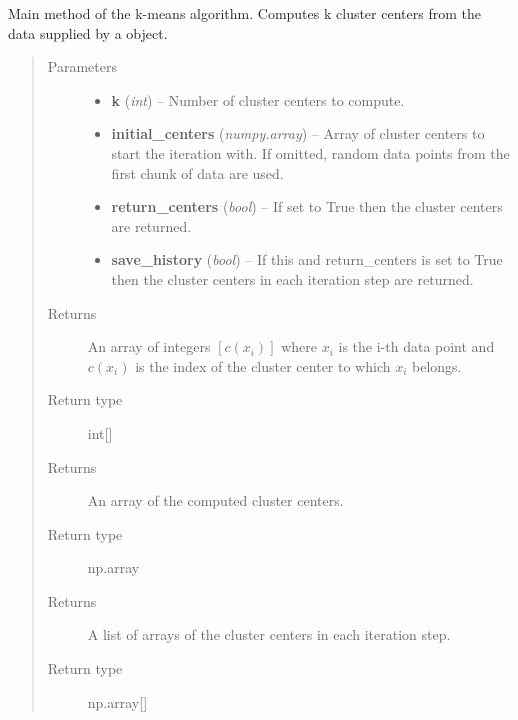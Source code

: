 \documentclass[letterpaper,10pt,english]{sphinxmanual}
\begin{document}
\begin{fulllineitems}
\begin{fulllineitems}
\label{kmeans:kmeans.DefaultKmeans.calculate_centers}
Main method of the k-means algorithm. Computes k cluster centers from the data supplied by a
{\hyperref[common:common_data_importer.CommonDataImporter]{}} object.
\begin{quote}\begin{description}
\item[{Parameters}] \leavevmode\begin{itemize}
\item {} 
\textbf{k} (\emph{int}) -- Number of cluster centers to compute.

\item {} 
\textbf{initial\_centers} (\emph{numpy.array}) -- Array of cluster centers to start the iteration with. If omitted, random data points
from the first chunk of data are used.

\item {} 
\textbf{return\_centers} (\emph{bool}) -- If set to True then the cluster centers are returned.

\item {} 
\textbf{save\_history} (\emph{bool}) -- If this and return\_centers is set to True then the cluster centers in each iteration step
are returned.

\end{itemize}

\item[{Returns}] \leavevmode
An array of integers \([c(x_i)]\) where \(x_i\) is the i-th data point and
\(c(x_i)\) is the index of the cluster center to which \(x_i\) belongs.

\item[{Return type}] \leavevmode
int{[}{]}

\item[{Returns}] \leavevmode
An array of the computed cluster centers.

\item[{Return type}] \leavevmode
np.array

\item[{Returns}] \leavevmode
A list of arrays of the cluster centers in each iteration step.

\item[{Return type}] \leavevmode
np.array{[}{]}

\end{description}\end{quote}

\end{fulllineitems}


\end{fulllineitems}
\end{document}
